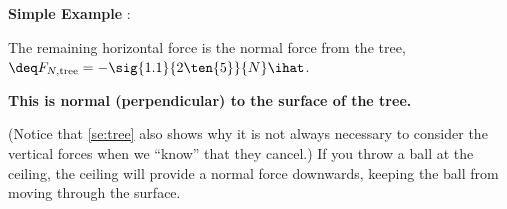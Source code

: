 \documentclass[11pt,letter,openany,makeidx]{book}
\newcounter{sample}
\newcounter{carrysample}
\renewcommand{\thesample}{Simple Example \arabic{sample}}
\newenvironment{sample}{\color{rgb:red,0;green,2;blue,1}\begin{list}{\textbf{\thesample}:}{\usecounter{sample} \setcounter{sample}{\value{carrysample}} \leftmargin 12pt}}{\end{list}\setcounter{carrysample}{\value{sample}}}
\begin{document}
\begin{sample}
\begin{minipage}[b]{240pt}
The remaining horizontal force is the normal force from the tree,
$ \deq F_{N,\mathrm{tree}} = -\sig{1.1}{2\ten{5}}{N} \ihat$.
\end{minipage}
\hfill\begin{minipage}[b]{130pt}
\end{minipage}
\textbf{This is normal (perpendicular) to the surface of the tree.}
\end{sample}%
(Notice that \ref{se:tree} also shows why it is not always necessary to consider the vertical forces when we ``know'' that they cancel.)  If you throw a ball at the ceiling, the ceiling will provide a normal force downwards, keeping the ball from moving through the surface.
%
\end{document}
